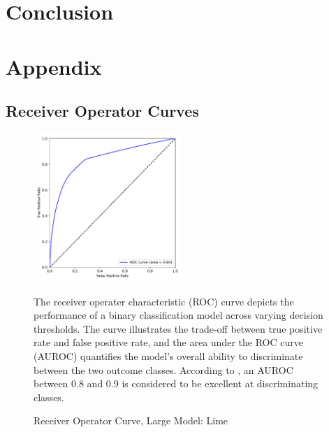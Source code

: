 \documentclass[12pt]{article}
\begin{document}
\section{Conclusion}
\label{section:conclusion}

\newpage
\printbibliography
\newpage

\section{Appendix}

\subsection{Receiver Operator Curves}
\begin{figure}[H]
    \centering
    \caption{Receiver Operator Curve, Large Model: Lime}
    \includegraphics[width=0.5\textwidth]{../output/lightgbm_roc_lime.pdf}
    \begin{minipage}{0.6\textwidth}
    \tiny
    The receiver operater characteristic (ROC) curve depicts the performance of a binary classification model across varying decision thresholds. The curve illustrates the trade-off between true positive rate and false positive rate, and the area under the ROC curve (AUROC) quantifies the model's overall ability to discriminate between the two outcome classes. According to \textcite{mandrekar_receiver_2010}, an AUROC between 0.8 and 0.9 is considered to be excellent at discriminating classes.
    \end{minipage}
    \label{fig:roc_lime}
\end{figure}
\end{document}
